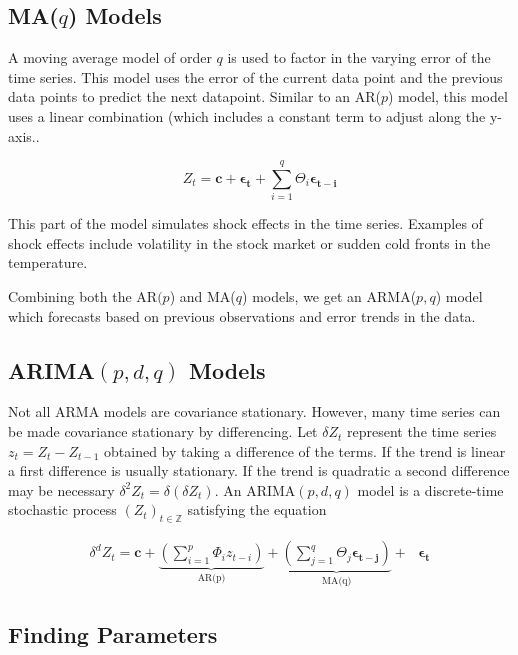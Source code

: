 \subsection*{MA($q$) Models}

A moving average model of order $q$ is used to factor in the varying error of the time series.
This model uses the error of the current data point and the previous data points to predict the next datapoint.
Similar to an AR($p$) model, this model uses a linear combination (which includes a constant term to adjust along the y-axis..

\begin{equation}
Z_t = \mathbf{c} + \boldsymbol{\epsilon_t} + \sum_{i=1}^q\Theta_i\boldsymbol{\epsilon_{t-i}}
\label{eq:MA}
\end{equation}

This part of the model simulates shock effects in the time series.
Examples of shock effects include volatility in the stock market or sudden cold fronts in the temperature.

Combining both the AR$(p$) and MA($q$) models, we get an ARMA($p,q$) model which forecasts based on previous observations and error trends in the data.

\subsection*{ARIMA$(p,d,q)$ Models}

Not all ARMA models are covariance stationary.
However, many time series can be made covariance stationary by differencing.
Let $\delta Z_t$ represent the time series $z_t = Z_t - Z_{t-1}$ obtained by taking a difference of the terms.
If the trend is linear a first difference is usually stationary.
If the trend is quadratic a second difference may be necessary $\delta ^2 Z_t = \delta ( \delta Z_t)$.
An $\text{ARIMA}(p,d,q)$ model is a discrete-time stochastic process $(Z_t)_{t \in \mathbb{Z}}$ satisfying the equation

\begin{align}
    \label{eq:arima:def}
    \delta ^ d Z_t = \mathbf{c} + \underbrace{\left(\sum_{i=1}^p \Phi_{i}z_{t - i}\right)}_\text{AR(p)} +
    \underbrace{\left(\sum_{j=1}^{q} \Theta_{j}\boldsymbol{\epsilon_{t-j}} \right)}_\text{MA(q)} + \text{ } \boldsymbol{\epsilon_t}
\end{align}


\subsection*{Finding Parameters}

